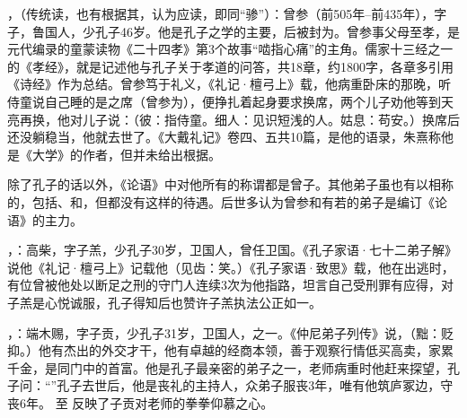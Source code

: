 ，（传统读，也有根据其，认为应读，即同“骖”）：曾参（前505年--前435年），字子，鲁国人，少孔子46岁。他是孔子之学的主要，后被封为。曾参事父母至孝，是元代编录的童蒙读物《二十四孝》第3个故事“啮指心痛”的主角。儒家十三经之一的《孝经》，就是记述他与孔子关于孝道的问答，共18章，约1800字，各章多引用《诗经》作为总结。曾参笃于礼义，《礼记·檀弓上》载，他病重卧床的那晚，听侍童说自己睡的是之席（曾参为），便挣扎着起身要求换席，两个儿子劝他等到天亮再换，他对儿子说：（彼：指侍童。细人：见识短浅的人。姑息：苟安。）换席后还没躺稳当，他就去世了。《大戴礼记》卷四、五共10篇，是他的语录，朱熹称他是《大学》的作者，但并未给出根据。

除了孔子的话以外，《论语》中对他所有的称谓都是曾子。其他弟子虽也有以相称的，包括、和，但都没有这样的待遇。后世多认为曾参和有若的弟子是编订《论语》的主力。%

，：高柴，字子羔，少孔子30岁，卫国人，曾任卫国。《孔子家语·七十二弟子解》说他《礼记·檀弓上》记载他（见齿：笑。）《孔子家语·致思》载，他在出逃时，有位曾被他处以断足之刑的守门人连续3次为他指路，坦言自己受刑罪有应得，对子羔是心悦诚服，孔子得知后也赞许子羔执法公正如一。

，：端木赐，字子贡，少孔子31岁，卫国人，之一。《仲尼弟子列传》说，（黜：贬抑。）他有杰出的外交才干，他有卓越的经商本领，善于观察行情低买高卖，家累千金，是同门中的首富。他是孔子最亲密的弟子之一，老师病重时他赶来探望，孔子问：“”孔子去世后，他是丧礼的主持人，众弟子服丧3年，唯有他筑庐冢边，守丧6年。 至  反映了子贡对老师的拳拳仰慕之心。

